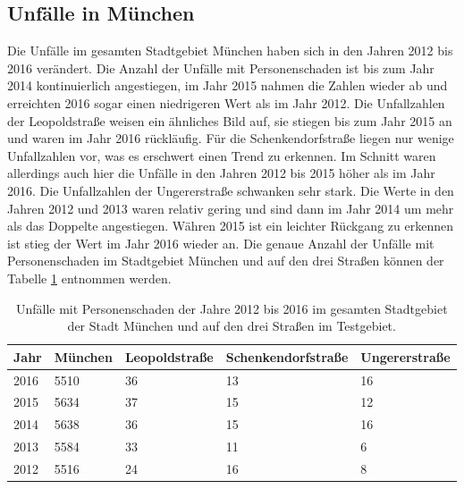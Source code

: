 \subsection{Unfälle in München}
Die Unfälle im gesamten Stadtgebiet München haben sich in den Jahren 2012 bis 2016 verändert. Die Anzahl der Unfälle mit Personenschaden ist bis zum Jahr 2014 kontinuierlich angestiegen, im Jahr 2015 nahmen die Zahlen wieder ab und erreichten 2016 sogar einen niedrigeren Wert als im Jahr 2012. Die Unfallzahlen der Leopoldstraße weisen ein ähnliches Bild auf, sie stiegen bis zum Jahr 2015 an und waren im Jahr 2016 rückläufig. Für die Schenkendorfstraße liegen nur wenige Unfallzahlen vor, was es erschwert einen Trend zu erkennen. Im Schnitt waren allerdings auch hier die Unfälle in den Jahren 2012 bis 2015 höher als im Jahr 2016. Die Unfallzahlen der Ungererstraße schwanken sehr stark. Die Werte in den Jahren 2012 und 2013 waren relativ gering und sind dann im Jahr 2014 um mehr als das Doppelte angestiegen. Währen 2015 ist ein leichter Rückgang zu erkennen ist stieg der Wert im Jahr 2016 wieder an. Die genaue Anzahl der Unfälle mit Personenschaden im Stadtgebiet München und auf den drei Straßen können der Tabelle \ref{tab:Unfälle München Personenschaden} entnommen werden.

\begin{table}[htpb]
	\scriptsize
	\caption[Unfälle mit Personenschaden]{Unfälle mit Personenschaden der Jahre 2012 bis 2016 im gesamten Stadtgebiet der Stadt München und auf den drei Straßen im Testgebiet.}\label{tab:Unfälle München Personenschaden}
	\centering
	\begin{tabular}{l l l  l p{2cm}}
		\toprule
		Jahr & München & Leopoldstraße & Schenkendorfstraße & Ungererstraße \\
		\midrule
		2016 & 5510\footnotemark[1] & 36 & 13 & 16\\
		2015 & 5634\footnotemark[2] & 37 & 15 & 12\\
		2014 & 5638\footnotemark[3] & 36 & 15 & 16\\
		2013 & 5584\footnotemark[4] & 33 & 11 & 6\\
		2012 & 5516\footnotemark[5] & 24 & 16 & 8\\
		\bottomrule
	\end{tabular}
\end{table}


